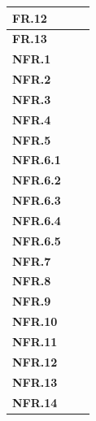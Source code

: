 \documentclass[10pt,a4paper]{article}
\newcommand{\fr}[1]{\textcolor{reqColor}{\textbf{FR.#1}}}
\newcommand{\nfr}[1]{\textcolor{reqColor}{\textbf{NFR.#1}}}
\begin{document}
\begin{longtable}[H]{| p{2.3cm} | p{2.7cm} | p{7cm}|}
  \hline \fr{12}    & & \\
  \hline \fr{13}    & & \\
  \hline \nfr{1}    & & \\
  \hline \nfr{2}    & & \\
  \hline \nfr{3}    & & \\
  \hline \nfr{4}    & & \\
  \hline \nfr{5}    & & \\
  \hline \nfr{6.1}  & & \\
  \hline \nfr{6.2}  & & \\
  \hline \nfr{6.3}  & & \\
  \hline \nfr{6.4}  & & \\
  \hline \nfr{6.5}  & & \\
  \hline \nfr{7}    & & \\
  \hline \nfr{8}    & & \\
  \hline \nfr{9}    & & \\
  \hline \nfr{10}   & & \\
  \hline \nfr{11}   & & \\
  \hline \nfr{12}   & & \\
  \hline \nfr{13}   & & \\
  \hline \nfr{14}   & & \\
  \hline
\end{longtable}






\vfill


\end{document}
